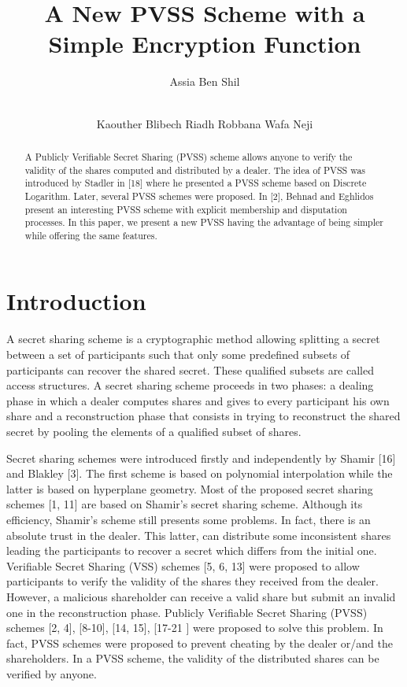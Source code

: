 \documentclass[submission,copyright,creativecommons]{eptcs}
\title{A New PVSS Scheme with a Simple Encryption Function}
\author{Assia Ben Shil
\institute{LIP2\\ Tunis, Tunisia}
\institute{Faculty of Sciences of Tunis\\
University of El Manar}
\email{essia.benshil@gmail.com}\\
\\
\and 
Kaouther Blibech  \qquad\qquad\qquad Riadh Robbana \qquad\qquad\qquad Wafa Neji
\institute{ \qquad\qquad LIP2\\   \qquad\qquad Tunis, Tunisia}
\email{kaouther.blibech@gmail.com \qquad riadh.robbana@fst.rnu.tn \qquad  neji.wafa@yahoo.fr}}
\begin{document}
\maketitle
\begin{abstract}
A Publicly Verifiable Secret Sharing (PVSS) scheme allows anyone to verify the validity of the shares computed
and distributed by a dealer. The idea of PVSS was introduced by Stadler in
[18] where he presented a PVSS scheme based on Discrete Logarithm. Later,
several PVSS schemes were proposed. In [2], Behnad and Eghlidos present an
interesting PVSS scheme with explicit membership and disputation processes.
In this paper, we present a new PVSS having the advantage of being simpler
while offering the same features.
\end{abstract}

\section{Introduction}

A secret sharing scheme is a cryptographic method allowing splitting a
secret between a set of participants such that only some predefined subsets
of participants can recover the shared secret. These qualified subsets are
called access structures. A secret sharing scheme proceeds in two phases: a
dealing phase in which a dealer computes shares and gives to every
participant his own share and a reconstruction phase that consists in trying
to reconstruct the shared secret by pooling the elements of a qualified
subset of shares.

Secret sharing schemes were introduced firstly and independently by Shamir
[16] and Blakley [3]. The first scheme is based on polynomial interpolation
while the latter is based on hyperplane geometry. Most of the proposed secret
sharing schemes [1, 11] are based on Shamir's secret sharing scheme. Although
its efficiency, Shamir's scheme still presents some problems. In fact, there
is an absolute trust in the dealer. This latter, can distribute some
inconsistent shares leading the participants to recover a secret which
differs from the initial one. Verifiable Secret Sharing (VSS) schemes [5, 6,
13] were proposed to allow participants to verify the validity of the shares
they received from the dealer. However, a malicious shareholder can receive
a valid share but submit an invalid one in the reconstruction phase.
Publicly Verifiable Secret Sharing (PVSS) schemes [2, 4], [8-10], [14, 15], [17-21 ] were
proposed to solve this problem. In fact, PVSS schemes were proposed to
prevent cheating by the dealer or/and the shareholders. In a PVSS scheme,
the validity of the distributed shares can be verified by anyone.
\end{document}
